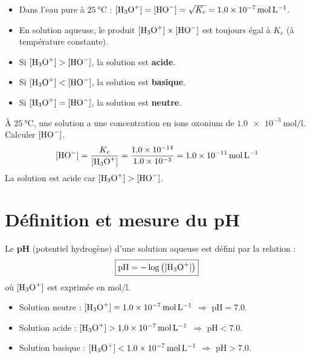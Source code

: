 \begin{propriete}[Conséquences]
\begin{itemize}
    \item Dans l'eau pure à $\SI{25}{\celsius}$ : $[\ce{H3O+}] = [\ce{HO-}] = \sqrt{K_e} = \SI{1.0e-7}{\mol\per\litre}$.
    \item En solution aqueuse, le produit $[\ce{H3O+}] \times [\ce{HO-}]$ est toujours égal à $K_e$ (à température constante).
    \item Si $[\ce{H3O+}] > [\ce{HO-}]$, la solution est \textbf{acide}.
    \item Si $[\ce{H3O+}] < [\ce{HO-}]$, la solution est \textbf{basique}.
    \item Si $[\ce{H3O+}] = [\ce{HO-}]$, la solution est \textbf{neutre}.
\end{itemize}
\end{propriete}

\begin{exemple}
À $\SI{25}{\celsius}$, une solution a une concentration en ions oxonium de $\SI{1.0e-3}{\mol\per\litre}$. Calculer $[\ce{HO-}]$.
\[
[\ce{HO-}] = \frac{K_e}{[\ce{H3O+}]} = \frac{\num{1.0e-14}}{\num{1.0e-3}} = \SI{1.0e-11}{\mol\per\litre}
\]
La solution est acide car $[\ce{H3O+}] > [\ce{HO-}]$.
\end{exemple}

\section{Définition et mesure du pH}

\begin{definition}[pH]
Le \textbf{pH} (potentiel hydrogène) d'une solution aqueuse est défini par la relation :
\[
\boxed{\text{pH} = -\log\left([\ce{H3O+}]\right)}
\]
où $[\ce{H3O+}]$ est exprimée en $\si{\mol\per\litre}$.
\end{definition}

\begin{propriete}
\begin{itemize}
    \item Solution neutre : $[\ce{H3O+}] = \SI{1.0e-7}{\mol\per\litre}$ $\Rightarrow$ $\text{pH} = 7.0$.
    \item Solution acide : $[\ce{H3O+}] > \SI{1.0e-7}{\mol\per\litre}$ $\Rightarrow$ $\text{pH} < 7.0$.
    \item Solution basique : $[\ce{H3O+}] < \SI{1.0e-7}{\mol\per\litre}$ $\Rightarrow$ $\text{pH} > 7.0$.
\end{itemize}
\end{propriete}

